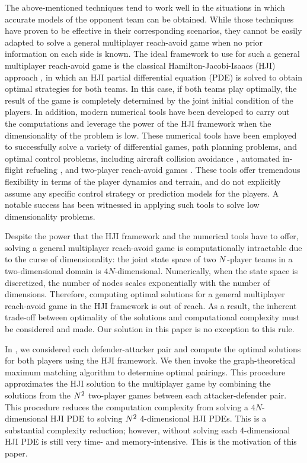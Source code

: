The above-mentioned techniques tend to work well in the situations in which accurate models of the opponent team can be obtained. While those techniques have proven to be effective in their corresponding scenarios, they cannot be easily adapted to solve a general multiplayer reach-avoid game when no prior information on each side is known. The ideal framework to use for such a general multiplayer reach-avoid game is the classical Hamilton-Jacobi-Isaacs (HJI) approach \cite{b:isaacs-1967}, in which an HJI partial differential equation (PDE) is solved to obtain optimal strategies for both teams. In this case, if both teams play optimally, the result of the game is completely determined by the joint initial condition of the players. In addition, modern numerical tools \cite{j:mitchell-TAC-2005, Sethian1996, b:osher-fedkiw-2002} have been developed to carry out the computations and leverage the power of the HJI framework when the dimensionality of the problem is low. These numerical tools have been employed to successfully solve a variety of differential games, path planning problems, and optimal control problems, including aircraft collision avoidance \cite{j:mitchell-TAC-2005}, automated in-flight refueling \cite{DSST08}, and two-player reach-avoid games \cite{Huang2011}. These tools offer tremendous flexibility in terms of the player dynamics and terrain, and do not explicitly assume any specific control strategy or prediction models for the players. A notable success \cite{j:mitchell-TAC-2005} has been witnessed in applying such tools to solve low dimensionality problems.

Despite the power that the HJI framework and the numerical tools have to offer, solving a general multiplayer reach-avoid game is computationally intractable due to the curse of dimensionality: the joint state space of two $N$-player teams in a two-dimensional domain is $4N$-dimensional. Numerically, when the state space is discretized, the number of nodes scales exponentially with the number of dimensions. Therefore, computing optimal solutions for a general multiplayer reach-avoid game in the HJI framework is out of reach. As a result, the inherent trade-off between optimality of the solutions and computational complexity must be considered and made. Our solution in this paper is no exception to this rule. 

In \cite{Chen2014}, we considered each defender-attacker pair and compute the optimal solutions for both players using the HJI framework. We then invoke the graph-theoretical maximum matching algorithm  \cite{Schrjiver2004, Karpinski1998} to determine optimal pairings. This procedure approximates the HJI solution to the multiplayer game by combining the solutions from the $N^2$ two-player games between each attacker-defender pair. This procedure reduces the computation complexity from solving a $4N$-dimensional HJI PDE to solving $N^2$ 4-dimensional HJI PDEs. This is a substantial complexity reduction; however, without solving each 4-dimensional HJI PDE is still very time- and memory-intensive. This is the motivation of this paper.

